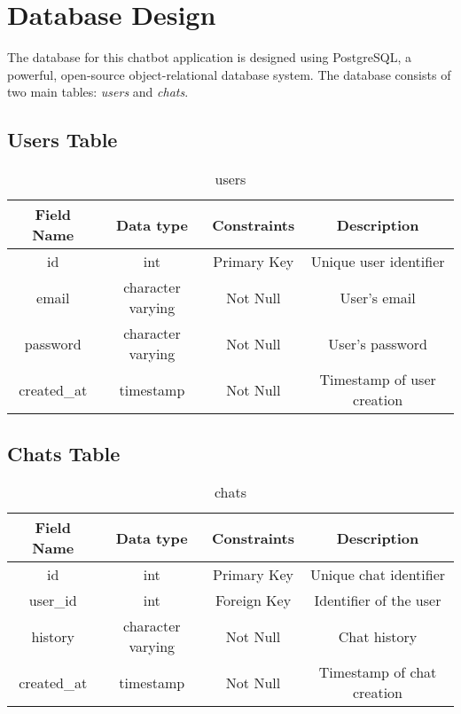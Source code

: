 \section{Database Design}
The database for this chatbot application is designed using PostgreSQL, a powerful, open-source object-relational database system. The database consists of two main tables: \textit{users} and \textit{chats}.

\subsection{Users Table}


\begin{table}[h!]
  \centering
  \caption{users}
  \vspace*{10pt}
  \begin{tabular}{|c|c|c|c|}
    \hline
    Field Name & Data type & Constraints & Description\\ \hline
    id & int & Primary Key & Unique user identifier\\ \hline
    email & character varying & Not Null & User's email\\ \hline
    password & character varying & Not Null & User's password\\ \hline
    created\_at & timestamp & Not Null & Timestamp of user creation\\ \hline
  \end{tabular}
\end{table}

\subsection{Chats Table}

\begin{table}[h!]
  \centering
  \caption{chats}
  \vspace*{10pt}
  \begin{tabular}{|c|c|c|c|}
    \hline
    Field Name & Data type & Constraints & Description\\ \hline
    id & int & Primary Key & Unique chat identifier\\ \hline
    user\_id & int & Foreign Key & Identifier of the user \\ \hline
    history & character varying & Not Null & Chat history\\ \hline
    created\_at & timestamp & Not Null & Timestamp of chat creation\\ \hline
  \end{tabular}
\end{table}

